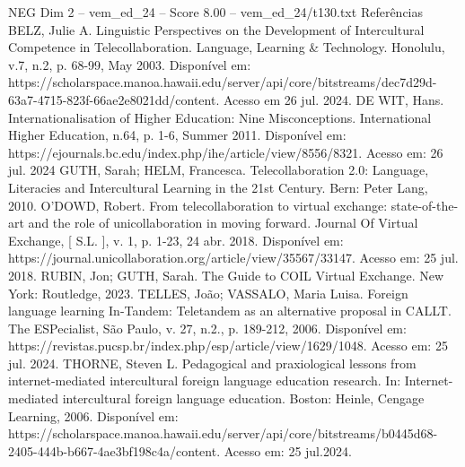 \begin{textsample}{NEG Dim 2 – vem\_ed\_24 – Score 8.00 – vem\_ed\_24/t130.txt}
Referências BELZ, Julie A.
Linguistic Perspectives on the Development of Intercultural Competence in Telecollaboration.
Language, Learning \& Technology.
Honolulu, v.7, n.2, p. 68-99, May 2003.
Disponível em: https://scholarspace.manoa.hawaii.edu/server/api/core/bitstreams/dec7d29d-63a7-4715-823f-66ae2e8021dd/content.
Acesso em 26 jul. 2024.
DE WIT, Hans.
Internationalisation of Higher Education: Nine Misconceptions.
International Higher Education, n.64, p. 1-6, Summer 2011.
Disponível em: https://ejournals.bc.edu/index.php/ihe/article/view/8556/8321.
Acesso em: 26 jul. 2024 GUTH, Sarah; HELM, Francesca.
Telecollaboration 2.0: Language, Literacies and Intercultural Learning in the 21st Century.
Bern: Peter Lang, 2010.
O'DOWD, Robert.
From telecollaboration to virtual exchange: state-of-the-art and the role of unicollaboration in moving forward.
Journal Of Virtual Exchange, [ S.L. ], v. 1, p. 1-23, 24 abr. 2018.
Disponível em: https://journal.unicollaboration.org/article/view/35567/33147.
Acesso em: 25 jul. 2018.
RUBIN, Jon; GUTH, Sarah.
The Guide to COIL Virtual Exchange.
New York: Routledge, 2023.
TELLES, João; VASSALO, Maria Luisa.
Foreign language learning In-Tandem: Teletandem as an alternative proposal in CALLT.
The ESPecialist, São Paulo, v. 27, n.2., p. 189-212, 2006.
Disponível em: https://revistas.pucsp.br/index.php/esp/article/view/1629/1048.
Acesso em: 25 jul. 2024.
THORNE, Steven L.
Pedagogical and praxiological lessons from internet-mediated intercultural foreign language education research.
In: Internet-mediated intercultural foreign language education.
Boston: Heinle, Cengage Learning, 2006.
Disponível em: https://scholarspace.manoa.hawaii.edu/server/api/core/bitstreams/b0445d68-2405-444b-b667-4ae3bf198c4a/content.
Acesso em: 25 jul.2024.

\end{textsample}
